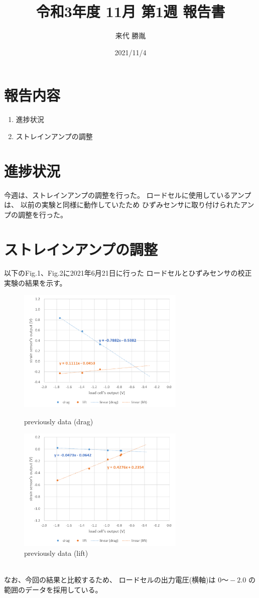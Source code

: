 \documentclass[twocolumn,a4j]{jsarticle}
\author{来代 勝胤}
\title{令和3年度 11月 第1週 報告書}
\date{2021/11/4}
\begin{document}
\columnseprule=0.1mm

\maketitle
\section*{報告内容}
\begin{enumerate}[1.]
    \item 進捗状況
    \item ストレインアンプの調整
\end{enumerate}
\section{進捗状況}
今週は、ストレインアンプの調整を行った。
ロードセルに使用しているアンプは、
以前の実験と同様に動作していたため
ひずみセンサに取り付けられたアンプの調整を行った。
\section{ストレインアンプの調整}
以下のFig.1、Fig.2に2021年6月21日に行った
ロードセルとひずみセンサの校正実験の結果を示す。
\begin{figure}[htbp]
    \footnotesize
    \begin{center}
        \includegraphics[width=80mm]{../images/previously_drag.png}
        \caption{previously data (drag)}
        \includegraphics[width=80mm]{../images/previously_lift.png}
        \caption{previously data (lift)}
    \end{center}
\end{figure}\\
なお、今回の結果と比較するため、
ロードセルの出力電圧(横軸)は $0 ～ -2.0$ の範囲のデータを採用している。
\newpage
\end{document}
